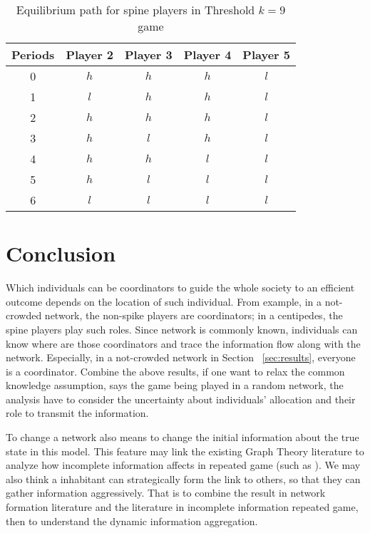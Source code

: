 \documentclass[12pt,letter]{article}
\theoremstyle{remark}
\theoremstyle{remark}
\theoremstyle{claim}
\begin{document}
\begin{table}[tbp]
\caption{Equilibrium path for spine players in Threshold $k=9$ game}
\label{eqnpath_thre_9}
\begin{center}
\begin{tabular}{ccccc}
Periods & Player 2 & Player 3 & Player 4 & Player 5 \\ \hline \hline
0 & $h$ & $h$ & $h$ & $l$\\ 
1 & $l$ & $h$ & $h$ & $l$\\ 
2 & $h$ & $h$ & $h$ & $l$\\ 
3 & $h$ & $l$ & $h$ & $l$\\ 
4 & $h$ & $h$ & $l$ & $l$\\ 
5 & $h$ & $l$ & $l$ & $l$\\ 
6 & $l$ & $l$ & $l$ & $l$\\ \hline \hline

\end{tabular}
\end{center}
\end{table}
















\section{Conclusion}
\label{sec:con}

Which individuals can be coordinators to guide the whole society to an efficient outcome depends on the location of such individual. From example, in a not-crowded network, the non-spike players are coordinators; in a centipedes, the spine players play such roles. Since network is commonly known, individuals can know where are those coordinators and trace the information flow along with the network. Especially, in a not-crowded network in Section ~\ref{sec:results}, everyone is a coordinator. Combine the above results, if one want to relax the common knowledge assumption, says the game being played in a random network, the analysis have to consider the uncertainty about individuals' allocation and their role to transmit the information. 

To change a network also means to change the initial information about the true state in this model. This feature may link the existing Graph Theory literature to analyze how incomplete information affects in repeated game (such as \cite{sorin1996}).  We may also think a inhabitant can strategically form the link to others, so that they can gather information aggressively. That is to combine the result in network formation literature \cite{JAsurvey2003} and the literature in incomplete information repeated game, then to understand the dynamic information aggregation.
\end{document}
